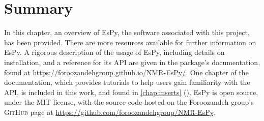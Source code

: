 \section{Summary}
In this chapter, an overview of \ac{EsPy}, the software associated with this project,
has been provided.
There are more resources available for further information on \ac{EsPy}. A rigorous
description of the usage of \ac{EsPy}, including details on installation, and a
reference for its \ac{API} are given in the package's documentation, found
at \url{https://foroozandehgroup.github.io/NMR-EsPy/}.
One chapter of the documentation, which provides tutorials to help users gain
familiarity with the \ac{API}, is included in this work, and found in
\cref{chap:inserts} ().
\ac{EsPy} is open source, under the \textsc{MIT} license, with the source code
hosted on the Foroozandeh group's \textsc{GitHub} page at
\url{https://github.com/foroozandehgroup/NMR-EsPy}.
